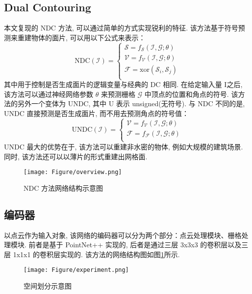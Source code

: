 \subsection{Dual Contouring}
本文复现的 NDC 方法, 可以通过简单的方式实现锐利的特征. 该方法基于符号预测来重建物体的面片, 可以用以下公式来表示：
\begin{equation}
    \mathrm{NDC}(\mathcal{I}) =
    \begin{cases}
        \mathcal{S} = f_{\mathcal{S}}(\mathcal{I,G};\theta) \\
        \mathcal{V} = f_{\mathcal{V}}(\mathcal{I,G};\theta) \\
        \mathcal{F} = \mathrm{xor}(\mathcal{S}_i, \mathcal{S}_j) \\
    \end{cases}
\end{equation}
其中用于控制是否生成面片的逻辑变量与经典的 DC 相同. 在给定输入量 I之后, 该方法可以通过神经网络参数 $\theta$ 来预测栅格 $\mathcal{G}$ 中顶点的位置和角点的符号. 
该方法的另外一个变体为 UNDC, 其中 U 表示 unsigned(无符号). 与 NDC 不同的是, UNDC 直接预测是否生成面片, 而不用去预测角点的符号值：
\begin{equation}
    \mathrm{UNDC}(\mathcal{I}) =
    \begin{cases}
        \mathcal{V} = f_{\mathcal{V}}(\mathcal{I,G};\theta) \\
        \mathcal{F} = f_{\mathcal{F}}(\mathcal{I,G};\theta) \\
    \end{cases}
\end{equation}
UNDC 最大的优势在于, 该方法可以重建非水密的物体, 例如大规模的建筑场景. 同时, 该方法还可以以薄片的形式重建出网格面. 

\begin{figure}[H]
	\center
	\texttt{[image: Figure/overview.png]}
	\centering
	\caption{NDC 方法网络结构示意图}\label{fig:fig-net}
\end{figure}

\subsection{编码器}
以点云作为输入对象, 该网络的编码器可以分为两个部分：点云处理模块、栅格处理模块. 前者是基于 PointNet++\cite{qi2017pointnet++} 实现的, 后者是通过三层 3x3x3 的卷积层以及三层 1x1x1 的卷积层实现的. 该方法的网络结构图如图\ref{fig:fig-net}所示. 

\begin{figure}[H]
	\center
	\texttt{[image: Figure/experiment.png]}
	\centering
	\caption{空间划分示意图}\label{fig:fig-seg}
\end{figure}

